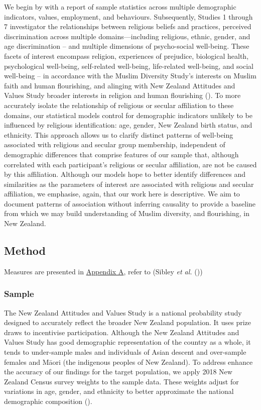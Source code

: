 \documentclass[
  single column]{article}
\begin{document}
We begin by with a report of sample statistics across multiple
demographic indicators, values, employment, and behaviours.
Subsequently, Studies 1 through 7 investigator the relationships between
religious beliefs and practices, perceived discrimination across
multiple domains---including religious, ethnic, gender, and age
discrimination -- and multiple dimensions of psycho-social well-being.
These facets of interest encompass religion, experiences of prejudice,
biological health, psychological well-being, self-related well-being,
life-related well-being, and social well-being -- in accordance with the
Muslim Diversity Study's interests on Muslim faith and human
flourishing, and alinging with New Zealand Attitudes and Values Study
broader interests in religion and human flourishing
(). To more
accurately isolate the relationship of religious or secular affiliation
to these domains, our statistical models control for demographic
indicators unlikely to be influenced by religious identification: age,
gender, New Zealand birth status, and ethnicity. This approach allows us
to clarify distinct patterns of well-being associated with religious and
secular group membership, independent of demographic differences that
comprise features of our sample that, although correlated with each
participant's religious or secular affiliation, are not be caused by
this affiliation. Although our models hope to better identify
differences and similarities as the parameters of interest are
associated with religious and secular affiliation, we emphasise, again,
that our work here is descriptive. We aim to document patterns of
association without inferring causality to provide a baseline from which
we may build understanding of Muslim diversity, and flourishing, in New
Zealand.

\subsection{Method}\label{method}

Measures are presented in \hyperref[appendix-a]{Appendix A}, refer to
(Sibley \emph{et al.} ())

\subsubsection{Sample}\label{sample}

The New Zealand Attitudes and Values Study is a national probability
study designed to accurately reflect the broader New Zealand population.
It uses prize draws to incentivise participation. Although the New
Zealand Attitudes and Values Study has good demographic representation
of the country as a whole, it tends to under-sample males and
individuals of Asian descent and over-sample females and Māori (the
indigenous peoples of New Zealand). To address enhance the accuracy of
our findings for the target population, we apply 2018 New Zealand Census
survey weights to the sample data. These weights adjust for variations
in age, gender, and ethnicity to better approximate the national
demographic composition ().
\end{document}
